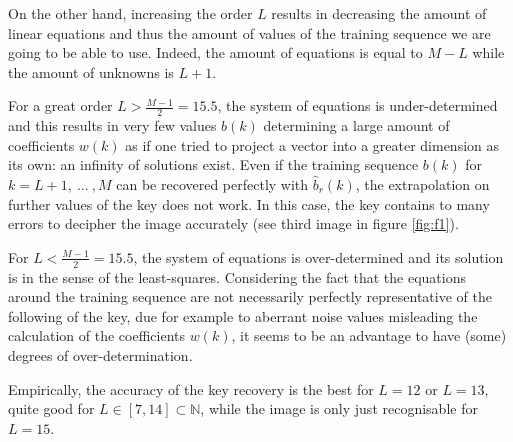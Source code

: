 \documentclass[twocolumn, 12pt]{IEEEtran}
\begin{document}
On the other hand, increasing the order $L$ results in decreasing the amount of linear equations and thus the amount of values of the training sequence we are going to be able to use. Indeed, the amount of equations is equal to $M-L$ while the amount of unknowns is $L+1$. 

For a great order $L > \frac{M-1}{2} = 15.5$, the system of equations is under-determined and this results in very few values $b(k)$ determining a large amount of coefficients $w(k)$ as if one tried to project a vector into a greater dimension as its own: an infinity of solutions exist. Even if the training sequence $b(k)$ for ${k=L+1,~\dots~, M}$ can be recovered perfectly with $\hat{b}_{r}(k)$, the extrapolation on further values of the key does not work. In this case, the key contains to many errors to decipher the image accurately (see third image in figure \ref{fig:f1}).


For $L < \frac{M-1}{2} = 15.5$, the system of equations is over-determined and its solution is in the sense of the least-squares. Considering the fact that the equations around the training sequence are not necessarily perfectly representative of the following of the key, due for example to aberrant noise values misleading the calculation of the coefficients $w(k)$, it seems to be an advantage to have (some) degrees of over-determination.

Empirically, the accuracy of the key recovery is the best for $L=12$ or $L=13$, quite good for ${L \in [7,14] \subset \mathbb{N}}$, while the image is only just recognisable for $L=15$.
\end{document}
